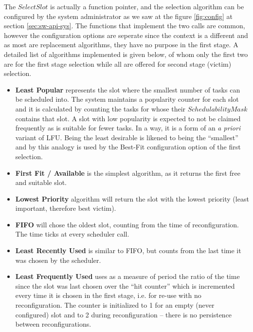 The $SelectSlot$ is actually a function pointer, and the selection algorithm can be configured by the system
administrator as we saw at the figure \ref{fig:config} at section \ref{sec:sw-api-sys}. The functions that
implement the two calls are common, however the configuration options are seperate since the context is
a different and as most are replacement algorithms, they have no purpose in the first stage.
A detailed list of algorithms implemented is given below, of whom only the first two
are for the first stage selection while all are offered for second stage (victim) selection.

\begin{itemize}
\item	\textbf{Least Popular} represents the slot where the smallest number of tasks can be scheduled into.
	The system maintains a popularity counter for each slot and it is calculated by counting the tasks
	for whose their $SchedulabilityMask$ contains that slot. A slot with low popularity is expected
	to not be claimed frequently as is suitable for fewer tasks. In a way, it is a form of an {\em a priori} variant of LFU.
	Being the least desirable is likened to being the ``smallest'' and by this analogy is used by 
	the Best-Fit configuration option of the first selection.
\item	\textbf{First Fit / Available} is the simplest algorithm, as it returns the first free and suitable slot.
\item	\textbf{Lowest Priority} algorithm will return the slot with the lowest priority (least important, therefore best victim).
\item	\textbf{FIFO} will chose the oldest slot, counting from the time of reconfiguration. The time ticks at every scheduler call.
\item	\textbf{Least Recently Used} is similar to FIFO, but counts from the last time it was chosen by the scheduler.
\item	\textbf{Least Frequently Used} uses as a measure of period the ratio of the time since the slot was last chosen
	over the ``hit counter'' which is incremented every time it is chosen in the first stage, i.e. for re-use with no reconfiguration.
	The counter is initialized to 1 for an empty (never configured) slot 
	and to 2 during reconfiguration -- there is no persistence between reconfigurations.
\end{itemize}



